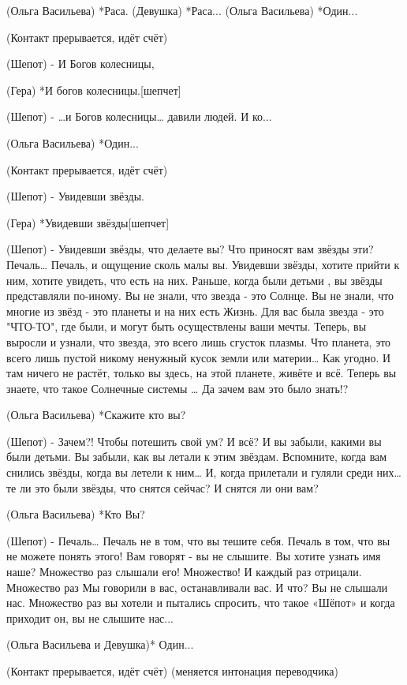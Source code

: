 (Ольга Васильева) *Раса.
(Девушка) *Раса...
(Ольга Васильева) *Один...


(Контакт прерывается, идёт счёт)


(Шепот) -  И Богов колесницы,

(Гера) *И богов колесницы.[шепчет]

(Шепот) - …и  Богов колесницы… давили людей. И ко...

(Ольга Васильева) *Один...



(Контакт прерывается, идёт счёт)


(Шепот)  - Увидевши звёзды.

(Гера) *Увидевши звёзды[шепчет]

(Шепот)  - Увидевши звёзды, что делаете вы? Что приносят вам звёзды эти? Печаль… Печаль, и ощущение сколь малы вы. Увидевши звёзды, хотите прийти к ним, хотите увидеть, что есть на них. Раньше, когда  были детьми , вы звёзды представляли по-иному. Вы не знали, что звезда - это Солнце. Вы не знали, что многие из звёзд - это планеты и на них есть Жизнь. Для вас была звезда - это "ЧТО-ТО", где были, и могут быть осуществлены ваши мечты. Теперь, вы выросли и узнали, что звезда, это всего лишь сгусток плазмы. Что планета, это всего лишь пустой никому ненужный кусок земли или материи… Как угодно. И там ничего не растёт, только вы здесь, на этой планете, живёте и всё. Теперь вы знаете, что такое Солнечные системы …  Да зачем вам это было знать!? 

(Ольга Васильева) *Скажите кто вы?

(Шепот)  - Зачем?! Чтобы потешить свой ум? И всё? И вы забыли, какими вы были детьми. Вы забыли, как вы летали к этим звёздам. Вспомните, когда вам снились звёзды, когда вы летели к ним… И, когда прилетали и гуляли среди них… те ли это были звёзды, что снятся сейчас? И снятся ли они вам?

(Ольга Васильева) *Кто Вы?

(Шепот) - Печаль… Печаль не в том, что вы тешите себя. Печаль в том, что вы не можете понять этого! Вам говорят - вы не слышите. Вы хотите узнать имя наше? Множество раз слышали его! Множество! И каждый раз отрицали. Множество раз Мы говорили в вас, останавливали вас. И что? Вы не слышали нас. Множество раз вы хотели и пытались спросить, что такое «Шёпот» и когда приходит он, вы не слышите нас...

(Ольга Васильева и Девушка)* Один...



(Контакт прерывается, идёт счёт)
(меняется интонация переводчика)


